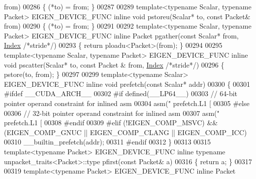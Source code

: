 \begin{DoxyCode}
      from)
00286 \{ (*to) = from; \}
00287 
00289 \textcolor{keyword}{template}<\textcolor{keyword}{typename} Scalar, \textcolor{keyword}{typename} Packet> EIGEN\_DEVICE\_FUNC \textcolor{keyword}{inline} \textcolor{keywordtype}{void} pstoreu(Scalar* to, \textcolor{keyword}{const} Packet& 
      from)
00290 \{  (*to) = from; \}
00291 
00292  \textcolor{keyword}{template}<\textcolor{keyword}{typename} Scalar, \textcolor{keyword}{typename} Packet> EIGEN\_DEVICE\_FUNC \textcolor{keyword}{inline} Packet pgather(\textcolor{keyword}{const} Scalar* from, 
      \hyperlink{namespace_eigen_a62e77e0933482dafde8fe197d9a2cfde}{Index} \textcolor{comment}{/*stride*/})
00293  \{ \textcolor{keywordflow}{return} ploadu<Packet>(from); \}
00294 
00295  \textcolor{keyword}{template}<\textcolor{keyword}{typename} Scalar, \textcolor{keyword}{typename} Packet> EIGEN\_DEVICE\_FUNC \textcolor{keyword}{inline} \textcolor{keywordtype}{void} pscatter(Scalar* to, \textcolor{keyword}{const} Packet
      & from, \hyperlink{namespace_eigen_a62e77e0933482dafde8fe197d9a2cfde}{Index} \textcolor{comment}{/*stride*/})
00296  \{ pstore(to, from); \}
00297 
00299 \textcolor{keyword}{template}<\textcolor{keyword}{typename} Scalar> EIGEN\_DEVICE\_FUNC \textcolor{keyword}{inline} \textcolor{keywordtype}{void} prefetch(\textcolor{keyword}{const} Scalar* addr)
00300 \{
00301 \textcolor{preprocessor}{#ifdef \_\_CUDA\_ARCH\_\_}
00302 \textcolor{preprocessor}{#if defined(\_\_LP64\_\_)}
00303   \textcolor{comment}{// 64-bit pointer operand constraint for inlined asm}
00304   \textcolor{keyword}{asm}(\textcolor{stringliteral}{" prefetch.L1 [ %
00305 \textcolor{preprocessor}{#else}
00306   \textcolor{comment}{// 32-bit pointer operand constraint for inlined asm}
00307   \textcolor{keyword}{asm}(\textcolor{stringliteral}{" prefetch.L1 [ %
00308 \textcolor{preprocessor}{#endif}
00309 \textcolor{preprocessor}{#elif (!EIGEN\_COMP\_MSVC) && (EIGEN\_COMP\_GNUC || EIGEN\_COMP\_CLANG || EIGEN\_COMP\_ICC)}
00310   \_\_builtin\_prefetch(addr);
00311 \textcolor{preprocessor}{#endif}
00312 \}
00313 
00315 \textcolor{keyword}{template}<\textcolor{keyword}{typename} Packet> EIGEN\_DEVICE\_FUNC \textcolor{keyword}{inline} \textcolor{keyword}{typename} unpacket\_traits<Packet>::type pfirst(\textcolor{keyword}{const} 
      Packet& a)
00316 \{ \textcolor{keywordflow}{return} a; \}
00317 
00319 \textcolor{keyword}{template}<\textcolor{keyword}{typename} Packet> EIGEN\_DEVICE\_FUNC \textcolor{keyword}{inline} Packet
}}
\end{DoxyCode}
